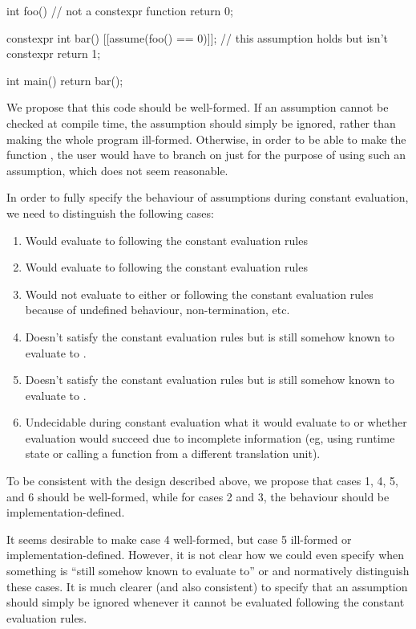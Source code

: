 \begin{codeblock}
int foo() {     // not a constexpr function
  return 0; 
}

constexpr int bar() {
  [[assume(foo() == 0)]];  // this assumption holds but isn't constexpr
  return 1;
}

int main() {
  return bar();
}
\end{codeblock}

We propose that this code should be well-formed. If an assumption cannot be checked at compile time, the assumption should simply be ignored, rather than making the whole program ill-formed. Otherwise, in order to be able to make the function , the user would have to branch on  just for the purpose of using such an assumption, which does not seem reasonable.

In order to fully specify the behaviour of assumptions during constant evaluation, we need to distinguish the following cases:

\begin{enumerate}
\item Would evaluate to  following the constant evaluation rules
\item Would evaluate to  following the constant evaluation rules
\item Would not evaluate to either  or  following the constant evaluation rules because of undefined behaviour, non-termination, etc.
\item Doesn't satisfy the constant evaluation rules but is still somehow known to evaluate to .
\item Doesn't satisfy the constant evaluation rules but is still somehow known to evaluate to .
\item Undecidable during constant evaluation what it would evaluate to or whether evaluation would succeed due to incomplete information (eg, using runtime state or calling a function from a different translation unit).
\end{enumerate}

To be consistent with the design described above, we propose that cases 1, 4, 5, and 6 should be well-formed, while for cases 2 and 3, the behaviour should be implementation-defined.

It seems desirable to make case 4 well-formed, but case 5 ill-formed or implementation-defined. However, it is not clear how we could even specify when something is ``still somehow known to evaluate to''  or  and normatively distinguish these cases. It is much clearer (and also consistent) to specify that an assumption should simply be ignored whenever it cannot be evaluated following the constant evaluation rules.

